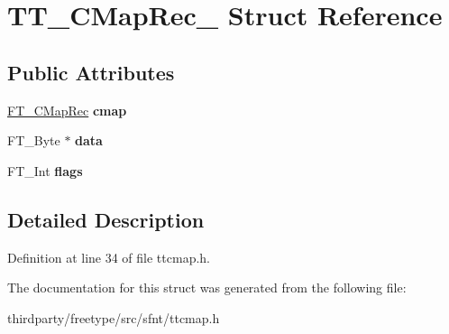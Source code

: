 \hypertarget{struct_t_t___c_map_rec__}{}\section{T\+T\+\_\+\+C\+Map\+Rec\+\_\+ Struct Reference}
\label{struct_t_t___c_map_rec__}
\subsection*{Public Attributes}
\begin{DoxyCompactItemize}
\item 
\mbox{\label{struct_t_t___c_map_rec___a77a7d03ad178a6acf63331d08b1297c5}} 
\hyperlink{struct_f_t___c_map_rec__}{F\+T\+\_\+\+C\+Map\+Rec} {\bfseries cmap}
\item 
\mbox{\label{struct_t_t___c_map_rec___a89a04acf15df8e457be5a8509008f4a5}} 
F\+T\+\_\+\+Byte $\ast$ {\bfseries data}
\item 
\mbox{\label{struct_t_t___c_map_rec___a85e2c31bb5858298ae9e8f708438e5ce}} 
F\+T\+\_\+\+Int {\bfseries flags}
\end{DoxyCompactItemize}


\subsection{Detailed Description}


Definition at line 34 of file ttcmap.\+h.



The documentation for this struct was generated from the following file\+:\begin{DoxyCompactItemize}
\item 
thirdparty/freetype/src/sfnt/ttcmap.\+h\end{DoxyCompactItemize}
